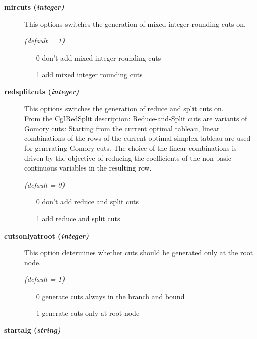 \begin{description}
\item[\label{mircuts}\hypertarget{mircuts}
{\textbf{mircuts (\slshape{integer})}}]\hspace{1.0in}

This options switches the generation of mixed integer rounding cuts on.

\textsl{(default = 1)}
\begin{itemize}
\item[0] don't add mixed integer rounding cuts
\item[1] add mixed integer rounding cuts
\end{itemize}

\item[\label{redsplitcuts}\hypertarget{redsplitcuts}
{\textbf{redsplitcuts (\slshape{integer})}}]\hspace{1.0in}

This options switches the generation of reduce and split cuts on.\\
From the CglRedSplit description:
Reduce-and-Split cuts are variants of Gomory cuts:
Starting from the current optimal tableau, linear combinations of the rows of the current optimal simplex tableau are used for generating Gomory cuts.
The choice of the linear combinations is driven by the objective of reducing the coefficients of the non basic continuous variables in the resulting row.

\textsl{(default = 0)}
\begin{itemize}
\item[0] don't add reduce and split cuts
\item[1] add reduce and split cuts
\end{itemize}

\item[\label{cutsonlyatroot}\hypertarget{cutsonlyatroot}
{\textbf{cutsonlyatroot (\slshape{integer})}}]\hspace{1.0in}

This option determines whether cuts should be generated only at the root node.

\textsl{(default = 1)}
\begin{itemize}
\item[0] generate cuts always in the branch and bound
\item[1] generate cuts only at root node
\end{itemize}

\item[\label{startalg}\hypertarget{startalg}
{\textbf{startalg (\slshape{string})}}]\hspace{1.0in}


\end{description}
